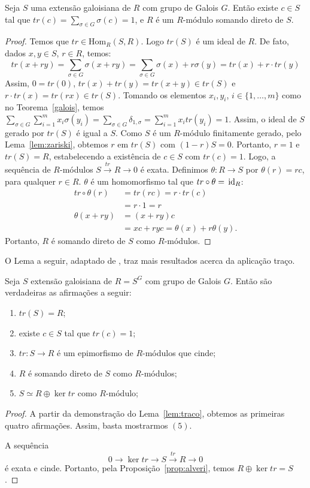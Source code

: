 \begin{lemma} \label{lem:traco}
Seja $S$ uma extensão galoisiana de $R$ com grupo de Galois $G$. Então existe $c \in S$ tal que $tr(c)=\sum_{\sigma\in G}\sigma(c)=1$, e $R$ é um $R$-módulo somando direto de $S$.
\begin{proof}
Temos que $tr \in \textrm{Hom}_R(S,R)$. Logo $tr(S)$ é um ideal de $R$. De fato, dados $x,y \in S$, $r \in R$, temos:
\[tr(x+ry) = \sum_{\sigma\in G}\sigma(x+ry) = \sum_{\sigma\in G}\sigma(x)+r\sigma(y) = tr(x)+r\cdot tr(y)\]
Assim, $0 = tr(0)$, $tr(x)+tr(y)=tr(x+y)\in tr(S)$ e $r\cdot tr(x) = tr(rx)\in tr(S)$. Tomando os elementos $x_i,y_i$, $i\in \{1,\dots, m\}$ como no Teorema~\ref{galois}, temos $\sum_{\sigma\in G} \sum_{i=1}^{m} x_i\sigma(y_i) = \sum_{\sigma \in G} \delta_{1,\sigma} = \sum_{i=1}^{m} x_i tr(y_i) = 1 $. Assim, o ideal de $S$ gerado por $tr(S)$ é igual a $S$. Como $S$ é um $R$-módulo finitamente gerado, pelo Lema~\ref{lem:zariski}, obtemos $r$ em $tr(S)$ com $(1-r)S=0$. Portanto, $r=1$ e $tr(S)=R$, estabelecendo a existência de $c \in S$ com $tr(c)=1$. Logo, a sequência de $R$-módulos $S\xrightarrow{tr}R\rightarrow 0$ é exata. Definimos $\theta:R \rightarrow S$ por $\theta(r)=rc$, para qualquer $r\in R$. $\theta$ é um homomorfismo tal que $tr \circ \theta = \, \textrm{id}_{R}$:
\begin{align*}
        tr \circ \theta (r) &= tr(rc) = r \cdot tr(c) \\
        &= r \cdot 1 = r \\
        \theta (x+ry) &= (x+ry)c \\
        &= xc + ryc = \theta(x) + r\theta(y).
\end{align*}
Portanto, $R$ é somando direto de $S$ como $R$-módulos.
\end{proof}
\end{lemma}
O Lema a seguir, adaptado de \cite[2.2]{thaisapaques}, traz mais resultados acerca da aplicação traço.
\begin{lemma}
Seja $S$ extensão galoisiana de $R=S^G$ com grupo de Galois $G$. Então são verdadeiras as afirmações a seguir:
\begin{enumerate}
    \item $tr(S) = R$;
    \item existe $c \in S$ tal que $tr(c) = 1$;
    \item $tr:S\rightarrow R$ é um epimorfismo de $R$-módulos que cinde;
    \item $R$ é somando direto de $S$ como $R$-módulos;
    \item $S\simeq R \oplus \ker{tr}$ como $R$-módulo;
\end{enumerate}
\begin{proof}
A partir da demonstração do Lema~\ref{lem:traco}, obtemos as primeiras quatro afirmações. Assim, basta mostrarmos $(5)$.\par 
A sequência \[0 \rightarrow \ker{tr} \rightarrow S \xrightarrow{tr} R \rightarrow 0\] é exata e cinde. Portanto, pela Proposição~\ref{prop:alveri}, temos $R\oplus \ker{tr} = S$.
\end{proof}
\end{lemma}


